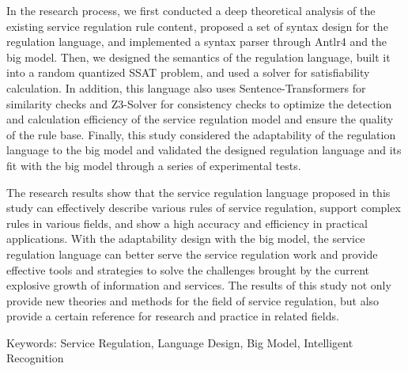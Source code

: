 In the research process, we first conducted a deep theoretical analysis of the existing service regulation rule content, proposed a set of syntax design for the regulation language, and implemented a syntax parser through Antlr4 and the big model. Then, we designed the semantics of the regulation language, built it into a random quantized SSAT problem, and used a solver for satisfiability calculation. In addition, this language also uses Sentence-Transformers for similarity checks and Z3-Solver for consistency checks to optimize the detection and calculation efficiency of the service regulation model and ensure the quality of the rule base. Finally, this study considered the adaptability of the regulation language to the big model and validated the designed regulation language and its fit with the big model through a series of experimental tests.

The research results show that the service regulation language proposed in this study can effectively describe various rules of service regulation, support complex rules in various fields, and show a high accuracy and efficiency in practical applications. With the adaptability design with the big model, the service regulation language can better serve the service regulation work and provide effective tools and strategies to solve the challenges brought by the current explosive growth of information and services. The results of this study not only provide new theories and methods for the field of service regulation, but also provide a certain reference for research and practice in related fields.

\vspace{1\baselineskip}
\noindent Keywords: Service Regulation, Language Design, Big Model, Intelligent Recognition